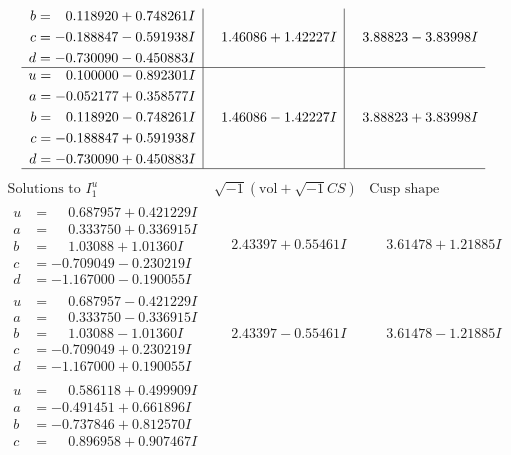 \documentclass[1p]{elsarticle_modified}
\theoremstyle{definition}
\newcommand{\I}{\sqrt{-1}}
\begin{document}
$$\begin{array}{c|c|c}
\begin{aligned}
b &= \phantom{-}0.118920 + 0.748261 I \\
c &= -0.188847 - 0.591938 I \\
d &= -0.730090 - 0.450883 I\end{aligned}
 & \phantom{-}1.46086 + 1.42227 I & \phantom{-}3.88823 - 3.83998 I \\ \hline\begin{aligned}
u &= \phantom{-}0.100000 - 0.892301 I \\
a &= -0.052177 + 0.358577 I \\
b &= \phantom{-}0.118920 - 0.748261 I \\
c &= -0.188847 + 0.591938 I \\
d &= -0.730090 + 0.450883 I\end{aligned}
 & \phantom{-}1.46086 - 1.42227 I & \phantom{-}3.88823 + 3.83998 I\\
 \hline 
 \end{array}$$\newpage$$\begin{array}{c|c|c}  
\text{Solutions to }I^u_{1}& \I (\text{vol} + \sqrt{-1}CS) & \text{Cusp shape}\\
 \hline 
\begin{aligned}
u &= \phantom{-}0.687957 + 0.421229 I \\
a &= \phantom{-}0.333750 + 0.336915 I \\
b &= \phantom{-}1.03088 + 1.01360 I \\
c &= -0.709049 - 0.230219 I \\
d &= -1.167000 - 0.190055 I\end{aligned}
 & \phantom{-}2.43397 + 0.55461 I & \phantom{-}3.61478 + 1.21885 I \\ \hline\begin{aligned}
u &= \phantom{-}0.687957 - 0.421229 I \\
a &= \phantom{-}0.333750 - 0.336915 I \\
b &= \phantom{-}1.03088 - 1.01360 I \\
c &= -0.709049 + 0.230219 I \\
d &= -1.167000 + 0.190055 I\end{aligned}
 & \phantom{-}2.43397 - 0.55461 I & \phantom{-}3.61478 - 1.21885 I \\ \hline\begin{aligned}
u &= \phantom{-}0.586118 + 0.499909 I \\
a &= -0.491451 + 0.661896 I \\
b &= -0.737846 + 0.812570 I \\
c &= \phantom{-}0.896958 + 0.907467 I \\

\end{aligned}
\end{array}$$
\end{document}

